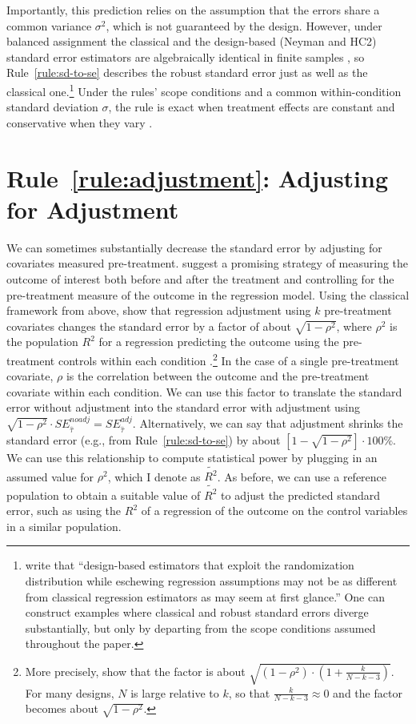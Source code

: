 \documentclass[12pt]{article}
\begin{document}
\noindent Importantly, this prediction relies on the assumption that the errors share a common variance $\sigma^{2}$, which is not guaranteed by the design.
However, under balanced assignment the classical and the design-based (Neyman and HC2) standard error estimators are algebraically identical in finite samples \citep[369--370]{Samii2012}, so Rule~\ref{rule:sd-to-se} describes the robust standard error just as well as the classical one.\footnote{
  \citet[370]{Samii2012} write that ``design-based estimators that exploit the randomization distribution while eschewing regression assumptions may not be as different from classical regression estimators as may seem at first glance.'' One can construct examples where classical and robust standard errors diverge substantially, but only by departing from the scope conditions assumed throughout the paper.
  }
Under the rules' scope conditions and a common within-condition standard deviation $\sigma$, the rule is exact when treatment effects are constant and conservative when they vary \citep[366--367]{Samii2012}.

\section*{Rule~\ref{rule:adjustment}: Adjusting for Adjustment}

We can sometimes substantially decrease the standard error by adjusting
for covariates measured pre-treatment.
\citet{Clifford2021} suggest a promising strategy of measuring the outcome of interest both before and after the treatment and controlling for the pre-treatment measure of the outcome in the regression model.
Using the classical framework from above, \citet[547]{Cox1982} show that regression adjustment using $k$ pre-treatment covariates changes the standard error by a factor of about $\sqrt{1 - \rho^{2}}$, where $\rho^{2}$ is the population $R^{2}$ for a regression predicting the outcome using the pre-treatment controls within each condition \citep{Bloom1995, Meyvis2017}.\footnote{
  More precisely, \citet[547]{Cox1982} show that the factor is about $\sqrt{\left( 1 - \rho^{2} \right) \cdot \left( 1 + \frac{k}{N - k - 3} \right)}$. For many designs, $N$ is large relative to $k$, so that $\frac{k}{N - k - 3} \approx 0$ and the factor becomes about $\sqrt{1 - \rho^{2}}$.
  }
In the case of a single pre-treatment covariate, $\rho$ is the correlation between the outcome and the pre-treatment covariate within each condition.
We can use this factor to translate the standard error without adjustment into the standard error with adjustment using $\sqrt{1 - \rho^{2}} \cdot SE_{\widehat{\tau}}^{noadj} = SE_{\widehat{\tau}}^{adj}$.
Alternatively, we can say that adjustment shrinks the standard error (e.g., from Rule~\ref{rule:sd-to-se}) by about $\left\lbrack 1 - \sqrt{1 - \rho^{2}} \right\rbrack \cdot 100\%$.
We can use this relationship to compute statistical power by plugging in an assumed value for $\rho^{2}$, which I denote as $\widetilde{R^{2}}$.
As before, we can use a reference population to obtain a suitable value of $\widetilde{R^{2}}$ to adjust the predicted standard error, such as using the $R^{2}$ of a regression of the outcome on the control variables in a similar population.
\end{document}

